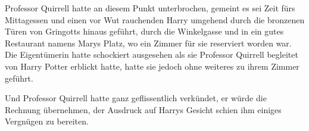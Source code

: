 Professor Quirrell hatte an diesem Punkt unterbrochen, gemeint es sei Zeit fürs Mittagessen und einen vor Wut rauchenden Harry umgehend durch die bronzenen Türen von Gringotts hinaus geführt, durch die Winkelgasse und in ein gutes Restaurant namens Marys Platz, wo ein Zimmer für sie reserviert worden war. Die Eigentümerin hatte schockiert ausgesehen als sie Professor Quirrell begleitet von Harry Potter erblickt hatte, hatte sie jedoch ohne weiteres zu ihrem Zimmer geführt.

Und Professor Quirrell hatte ganz geflissentlich verkündet, er würde die Rechnung übernehmen, der Ausdruck auf Harrys Gesicht schien ihm einiges Vergnügen zu bereiten.


